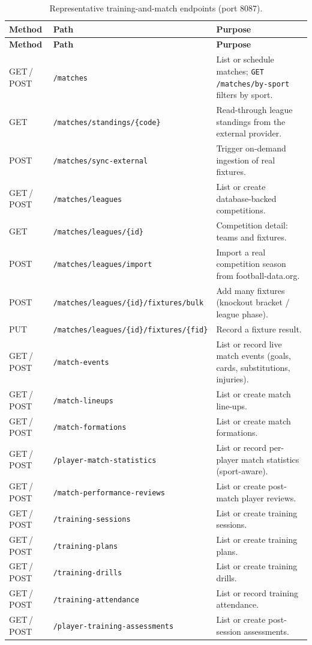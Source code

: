 \begin{longtable}{p{} p{} p{}}
\caption{Representative training-and-match endpoints (port 8087).}
\label{tab:api-training}\\
\toprule
\textbf{Method} & \textbf{Path} & \textbf{Purpose} \\
\midrule
\endfirsthead
\toprule
\textbf{Method} & \textbf{Path} & \textbf{Purpose} \\
\midrule
\endhead
\bottomrule
\endlastfoot
GET\,/\,POST & \texttt{/matches} & List or schedule matches; \texttt{GET /matches/by-sport} filters by sport. \\
GET    & \texttt{/matches/standings/\{code\}} & Read-through league standings from the external provider. \\
POST   & \texttt{/matches/sync-external} & Trigger on-demand ingestion of real fixtures. \\
GET\,/\,POST & \texttt{/matches/leagues} & List or create database-backed competitions. \\
GET    & \texttt{/matches/leagues/\{id\}} & Competition detail: teams and fixtures. \\
POST   & \texttt{/matches/leagues/import} & Import a real competition season from football-data.org. \\
POST   & \texttt{/matches/leagues/\{id\}/fixtures/bulk} & Add many fixtures (knockout bracket / league phase). \\
PUT    & \texttt{/matches/leagues/\{id\}/fixtures/\{fid\}} & Record a fixture result. \\
GET\,/\,POST & \texttt{/match-events} & List or record live match events (goals, cards, substitutions, injuries). \\
GET\,/\,POST & \texttt{/match-lineups} & List or create match line-ups. \\
GET\,/\,POST & \texttt{/match-formations} & List or create match formations. \\
GET\,/\,POST & \texttt{/player-match-statistics} & List or record per-player match statistics (sport-aware). \\
GET\,/\,POST & \texttt{/match-performance-reviews} & List or create post-match player reviews. \\
GET\,/\,POST & \texttt{/training-sessions} & List or create training sessions. \\
GET\,/\,POST & \texttt{/training-plans} & List or create training plans. \\
GET\,/\,POST & \texttt{/training-drills} & List or create training drills. \\
GET\,/\,POST & \texttt{/training-attendance} & List or record training attendance. \\
GET\,/\,POST & \texttt{/player-training-assessments} & List or create post-session assessments. \\
\end{longtable}

